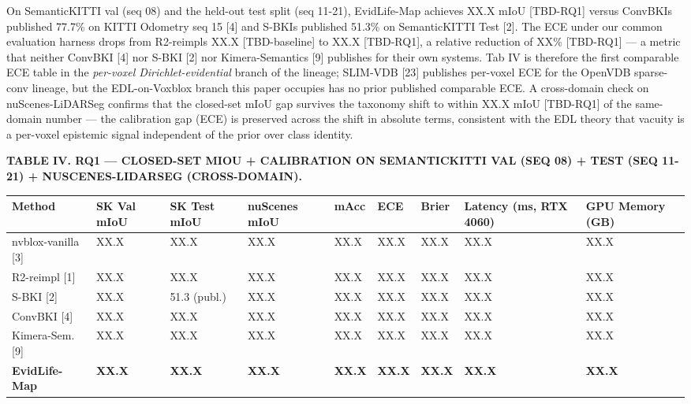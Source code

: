 \documentclass[
]{article}
\newcounter{none} %
\begin{document}
On SemanticKITTI val (seq 08) and the held-out test split (seq 11-21),
EvidLife-Map achieves XX.X mIoU {[}TBD-RQ1{]} versus
ConvBKI\textquotesingle s published 77.7\% on KITTI Odometry seq 15
{[}4{]} and S-BKI\textquotesingle s published 51.3\% on SemanticKITTI
Test {[}2{]}. The ECE under our common evaluation harness drops from
R2-reimpl\textquotesingle s XX.X {[}TBD-baseline{]} to XX.X
{[}TBD-RQ1{]}, a relative reduction of XX\% {[}TBD-RQ1{]} --- a metric
that neither ConvBKI {[}4{]} nor S-BKI {[}2{]} nor Kimera-Semantics
{[}9{]} publishes for their own systems. Tab IV is therefore the first
comparable ECE table in the \emph{per-voxel Dirichlet-evidential} branch
of the lineage; SLIM-VDB {[}23{]} publishes per-voxel ECE for the
OpenVDB sparse-conv lineage, but the EDL-on-Voxblox branch this paper
occupies has no prior published comparable ECE. A cross-domain check on
nuScenes-LiDARSeg confirms that the closed-set mIoU gap survives the
taxonomy shift to within XX.X mIoU {[}TBD-RQ1{]} of the same-domain
number --- the calibration gap (ECE) is preserved across the shift in
absolute terms, consistent with the EDL theory that vacuity is a
per-voxel epistemic signal independent of the prior over class identity.

\textbf{TABLE IV. RQ1 --- CLOSED-SET MIOU + CALIBRATION ON SEMANTICKITTI
VAL (SEQ 08) + TEST (SEQ 11-21) + NUSCENES-LIDARSEG (CROSS-DOMAIN).}

{\def\LTcaptype{none} %
\begin{longtable}[]{@{}lllllllll@{}}
\toprule\noalign{}
Method & SK Val mIoU & SK Test mIoU & nuScenes mIoU & mAcc & ECE & Brier
& Latency (ms, RTX 4060) & GPU Memory (GB) \\
\midrule\noalign{}
\endhead
\bottomrule\noalign{}
\endlastfoot
nvblox-vanilla {[}3{]} & XX.X & XX.X & XX.X & XX.X & XX.X & XX.X & XX.X
& XX.X \\
R2-reimpl {[}1{]} & XX.X & XX.X & XX.X & XX.X & XX.X & XX.X & XX.X &
XX.X \\
S-BKI {[}2{]} & XX.X & 51.3 (publ.) & XX.X & XX.X & XX.X & XX.X & XX.X &
XX.X \\
ConvBKI {[}4{]} & XX.X & XX.X & XX.X & XX.X & XX.X & XX.X & XX.X &
XX.X \\
Kimera-Sem. {[}9{]} & XX.X & XX.X & XX.X & XX.X & XX.X & XX.X & XX.X &
XX.X \\
\textbf{EvidLife-Map} & \textbf{XX.X} & \textbf{XX.X} & \textbf{XX.X} &
\textbf{XX.X} & \textbf{XX.X} & \textbf{XX.X} & \textbf{XX.X} &
\textbf{XX.X} \\
\end{longtable}
}
\end{document}
